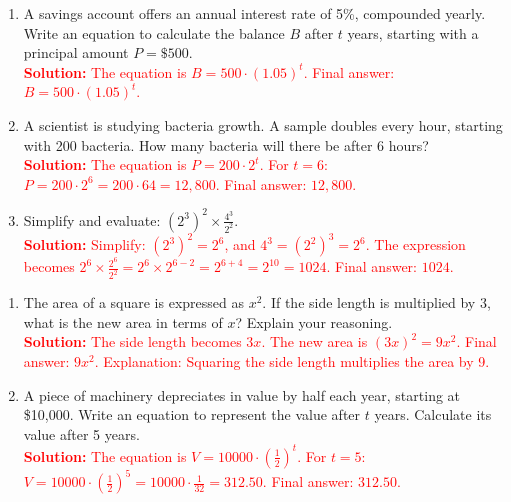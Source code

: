 \documentclass[9pt]{article}
\begin{document}
\vspace{1em}
\begin{tcolorbox}[colframe=black!60, colback=white, 
coltitle=black, colbacktitle=black!15, fonttitle=\bfseries\Large, 
title=Problems (Part 1), halign title=center, left=10pt, right=10pt, top=10pt, bottom=50pt]
\begin{enumerate}[start=10, itemsep=3em]
    \item A savings account offers an annual interest rate of 5\%, compounded yearly. Write an equation to calculate the balance \(B\) after \(t\) years, starting with a principal amount \(P = \$500\).\\
    \textcolor{red}{\textbf{Solution:} The equation is \(B = 500 \cdot (1.05)^t\). Final answer: \(B = 500 \cdot (1.05)^t\).}

    \item A scientist is studying bacteria growth. A sample doubles every hour, starting with 200 bacteria. How many bacteria will there be after 6 hours?\\
    \textcolor{red}{\textbf{Solution:} The equation is \(P = 200 \cdot 2^t\). For \(t = 6\): \(P = 200 \cdot 2^6 = 200 \cdot 64 = 12,800\). Final answer: \(12,800\).}

    \item Simplify and evaluate: \( (2^3)^2 \times \frac{4^3}{2^2} \).\\
    \textcolor{red}{\textbf{Solution:} Simplify: \((2^3)^2 = 2^6\), and \(4^3 = (2^2)^3 = 2^6\). The expression becomes \(2^6 \times \frac{2^6}{2^2} = 2^6 \times 2^{6-2} = 2^{6+4} = 2^{10} = 1024\). Final answer: \(1024\).}
\end{enumerate}
\end{tcolorbox}

\vspace{1em}
\begin{tcolorbox}[colframe=black!60, colback=white, 
coltitle=black, colbacktitle=black!15, fonttitle=\bfseries\Large, 
title=Problems (Part 2), halign title=center, left=10pt, right=10pt, top=10pt, bottom=50pt]
\begin{enumerate}[start=13, itemsep=3em]
    \item The area of a square is expressed as \(x^2\). If the side length is multiplied by \(3\), what is the new area in terms of \(x\)? Explain your reasoning.\\
    \textcolor{red}{\textbf{Solution:} The side length becomes \(3x\). The new area is \((3x)^2 = 9x^2\). Final answer: \(9x^2\). Explanation: Squaring the side length multiplies the area by 9.}

    \item A piece of machinery depreciates in value by half each year, starting at \$10,000. Write an equation to represent the value after \(t\) years. Calculate its value after 5 years.\\
    \textcolor{red}{\textbf{Solution:} The equation is \(V = 10000 \cdot \left(\frac{1}{2}\right)^t\). For \(t = 5\): \(V = 10000 \cdot \left(\frac{1}{2}\right)^5 = 10000 \cdot \frac{1}{32} = 312.50\). Final answer: \(312.50\).}
\end{enumerate}
\end{tcolorbox}
\end{document}
